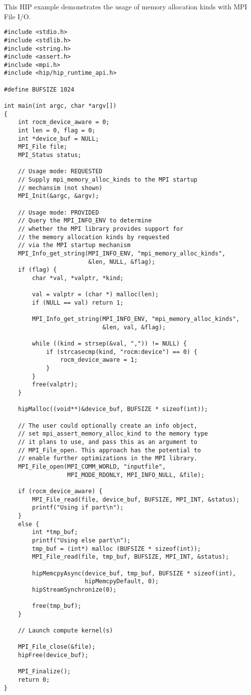 \begin{example}
\label{example:alloc-kind-wpm-hip}
This HIP example demonstrates the usage of memory
allocation kinds with MPI File I/O. 

\begin{lstlisting}[language={[MPI]C}]
#include <stdio.h>
#include <stdlib.h>
#include <string.h>
#include <assert.h>
#include <mpi.h>
#include <hip/hip_runtime_api.h>

#define BUFSIZE 1024

int main(int argc, char *argv[])
{
    int rocm_device_aware = 0;
    int len = 0, flag = 0;
    int *device_buf = NULL;
    MPI_File file;
    MPI_Status status;

    // Usage mode: REQUESTED
    // Supply mpi_memory_alloc_kinds to the MPI startup
    // mechansim (not shown)
    MPI_Init(&argc, &argv);

    // Usage mode: PROVIDED
    // Query the MPI_INFO_ENV to determine
    // whether the MPI library provides support for
    // the memory allocation kinds by requested
    // via the MPI startup mechanism
    MPI_Info_get_string(MPI_INFO_ENV, "mpi_memory_alloc_kinds",
                        &len, NULL, &flag);
    if (flag) {
        char *val, *valptr, *kind;

        val = valptr = (char *) malloc(len);
        if (NULL == val) return 1;

        MPI_Info_get_string(MPI_INFO_ENV, "mpi_memory_alloc_kinds",
                            &len, val, &flag);

        while ((kind = strsep(&val, ",")) != NULL) {
            if (strcasecmp(kind, "rocm:device") == 0) {
                rocm_device_aware = 1;
            }
        }
        free(valptr);
    }

    hipMalloc((void**)&device_buf, BUFSIZE * sizeof(int));

    // The user could optionally create an info object,
    // set mpi_assert_memory_alloc_kind to the memory type
    // it plans to use, and pass this as an argument to
    // MPI_File_open. This approach has the potential to
    // enable further optimizations in the MPI library.
    MPI_File_open(MPI_COMM_WORLD, "inputfile",
                  MPI_MODE_RDONLY, MPI_INFO_NULL, &file);

    if (rocm_device_aware) {
        MPI_File_read(file, device_buf, BUFSIZE, MPI_INT, &status);
        printf("Using if part\n");
    }
    else {
        int *tmp_buf;
        printf("Using else part\n");
        tmp_buf = (int*) malloc (BUFSIZE * sizeof(int));
        MPI_File_read(file, tmp_buf, BUFSIZE, MPI_INT, &status);

        hipMemcpyAsync(device_buf, tmp_buf, BUFSIZE * sizeof(int),
                       hipMemcpyDefault, 0);
        hipStreamSynchronize(0);

        free(tmp_buf);
    }

    // Launch compute kernel(s)

    MPI_File_close(&file);
    hipFree(device_buf);

    MPI_Finalize();
    return 0;
}
\end{lstlisting}
\end{example}
